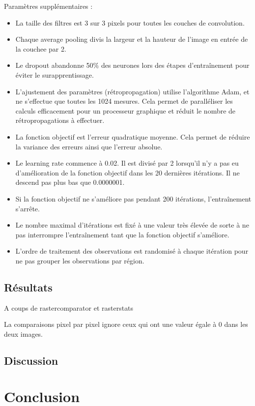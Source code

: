\documentclass[a4paper, 11pt]{report}
\begin{document}
Paramètres supplémentaires :
\begin{itemize}
	\item La taille des filtres est 3 sur 3 pixels pour toutes les couches de convolution.
	\item Chaque average pooling divis la largeur et la hauteur de l'image en entrée de la couchee par 2.
	\item Le dropout abandonne 50\% des neurones lors des étapes d'entraînement pour éviter le surapprentissage.
	\item L'ajustement des paramètres (rétropropagation) utilise l'algorithme Adam, et ne s'effectue que toutes les 1024 mesures. Cela permet de paralléliser les calculs efficacement pour un processeur graphique et réduit le nombre de rétropropagations à effectuer.
	\item La fonction objectif est l'erreur quadratique moyenne. Cela permet de réduire la variance des erreurs ainsi que l'erreur absolue.
	\item Le learning rate commence à 0.02. Il est divisé par 2 lorsqu'il n'y a pas eu d'amélioration de la fonction objectif dans les 20 dernières itérations. Il ne descend pas plus bas que 0.0000001.
	\item Si la fonction objectif ne s'améliore pas pendant 200 itérations, l'entraînement s'arrête.
	\item Le nombre maximal d'itérations est fixé à une valeur très élevée de sorte à ne pas interrompre l'entraînement tant que la fonction objectif s'améliore.
	\item L'ordre de traitement des observations est randomisé à chaque itération pour ne pas grouper les observations par région.
\end{itemize}

\section{Résultats}

A coups de rastercomparator et rasterstats

La comparaisons pixel par pixel ignore ceux qui ont une valeur égale à 0 dans les deux images.


\section{Discussion}

\chapter{Conclusion}
\end{document}

